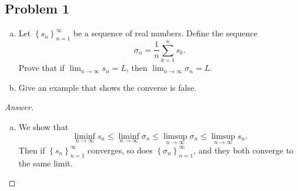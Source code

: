 \documentclass[12pt]{article}
\newcommand\setb[1]{\left \{ #1 \right \}}
\theoremstyle{definition}
\begin{document}
\subsection{Problem 1 \texorpdfstring{\cite{Cesaro}}{}}
\begin{enumerate}[(a)]
    \item Let $\setb{ s_n }_{n = 1}^{\infty}$ be a sequence of real numbers. Define the sequence 
    \[
        \sigma_n = \frac{1}{n} \sum\limits_{k = 1}^n s_k.
    \]
    Prove that if $\lim_{n \to \infty} s_n = L$, then $\lim_{n \to \infty} \sigma_n = L$.
    \item Give an example that shows the converse is false.
\end{enumerate}
\begin{proof}[Answer]
    \noindent
    \begin{enumerate}[(a)]
        \item We show that 
        \[
            \liminf\limits_{n \to \infty} s_n \leq \liminf\limits_{n \to \infty} \sigma_n \leq \limsup\limits_{n \to \infty} \sigma_n \leq \limsup\limits_{n \to \infty} s_n .
        \]
        Then if $\setb{ s_n }_{n = 1}^{\infty}$ converges, so does $\setb{ \sigma_n }_{n = 1}^{\infty}$, and they both converge to the same limit.
        

\end{enumerate}
\end{proof}
\end{document}
